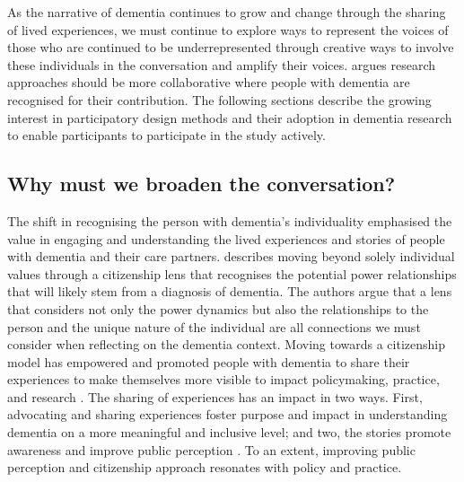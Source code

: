 As the narrative of dementia continues to grow and change through the sharing of lived experiences, we must continue to explore ways to represent the voices of those who are continued to be underrepresented through creative ways to involve these individuals in the conversation and amplify their voices. \cite{swarbrick2015quest} argues research approaches should be more collaborative where people with dementia are recognised for their contribution. The following sections describe the growing interest in participatory design methods and their adoption in dementia research to enable participants to participate in the study actively. 

\subsection{Why must we broaden the conversation?}
\label{Design-conversation}
The shift in recognising the person with dementia's individuality emphasised the value in engaging and understanding the lived experiences and stories of people with dementia and their care partners. \cite{bartlett_personhood_2007} describes moving beyond solely individual values through a citizenship lens that recognises the potential power relationships that will likely stem from a diagnosis of dementia. The authors argue that a lens that considers not only the power dynamics but also the relationships to the person and the unique nature of the individual are all connections we must consider when reflecting on the dementia context. Moving towards a citizenship model has empowered and promoted people with dementia to share their experiences to make themselves more visible to impact policymaking, practice, and research \citep{weetch_involvement_2020}. The sharing of experiences has an impact in two ways. First, advocating and sharing experiences foster purpose and impact in understanding dementia on a more meaningful and inclusive level; and two, the stories promote awareness and improve public perception \citep{reynolds2017stigma}. To an extent, improving public perception and citizenship approach resonates with policy and practice. 

